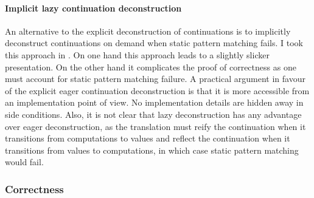 \documentclass[12pt,phd,lfcs,twoside,openright,logo,leftchapter,normalheadings]{infthesis}
\theoremstyle{plain}
\theoremstyle{definition}
\begin{document}
\paragraph{Implicit lazy continuation deconstruction}
%
An alternative to the explicit deconstruction of continuations is to
implicitly deconstruct continuations on demand when static pattern
matching fails. I took this approach in \citet{HillerstromLAS17}. On
one hand this approach leads to a slightly slicker presentation. On
the other hand it complicates the proof of correctness as one must
account for static pattern matching failure.
%
A practical argument in favour of the explicit eager continuation
deconstruction is that it is more accessible from an implementation
point of view. No implementation details are hidden away in side
conditions.
%
Also, it is not clear that lazy deconstruction has any advantage over
eager deconstruction, as the translation must reify the continuation
when it transitions from computations to values and reflect the
continuation when it transitions from values to computations, in which
case static pattern matching would fail.

\subsubsection{Correctness}
\label{sec:higher-order-cps-deep-handlers-correctness}
\end{document}
